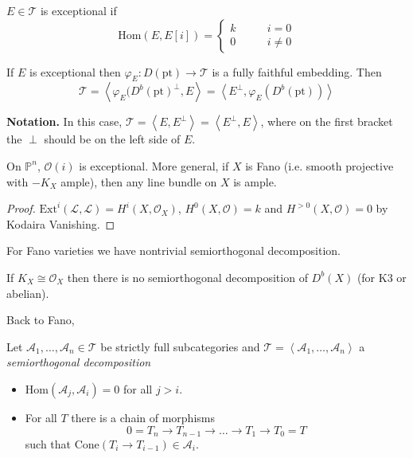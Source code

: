 \medskip\noindent
\begin{definition}
\label{definition-exceptional-object}
$E \in \mathcal{T}$ is exceptional if
$$
\text{Hom}(E,E[i])=
\begin{cases}
k\qquad &i=0 \\
0\qquad &i \neq 0
\end{cases}
$$
\end{definition}

\begin{lemma}
\label{dcos-label-024}
If $E$ is exceptional then
$\varphi_E:D(\text{pt}) \to \mathcal{T}$ is a
fully faithful embedding. Then
$$
\mathcal{T}=\left\langle{}\varphi_E(D^b(\text{pt})
^\perp,E\right\rangle{}=
\left\langle{}E^\perp,\varphi_E(D^b(\text{pt}))
\right\rangle{}
$$
\end{lemma}

{\bf Notation.} In this case,
$\mathcal{T}=\left\langle{}E,E^\perp\right\rangle{}=
\left\langle{}E^\perp,E\right\rangle{}$,
where on the first bracket the $\perp$ should
be on the left side of $E$.

\begin{example}
\label{dcos-label-025}
On  $\mathbb{P}^n$, $\mathcal{O}(i)$ is
exceptional. More general, if $X$ is Fano
(i.e. smooth projective with $-K_X$ ample),
then any line bundle on  $X$ is ample.
\end{example}

\begin{proof}
$\text{Ext}^i(\mathcal{L},\mathcal{L})=H^{i}
(X,\mathcal{O}_X)$,
$H^{0}(X,\mathcal{O})=k$ and
$H^{>0}(X,\mathcal{O})=0$ by Kodaira
Vanishing.
\end{proof}

For Fano varieties we have nontrivial
semiorthogonal decomposition.

\begin{remark}
\label{dcos-label-026}
If $K_X \cong \mathcal{O}_X$ then there is no
semiorthogonal decomposition of $D^b(X)$ (for
K3 or abelian).
\end{remark}

Back to Fano,
\begin{definition}
\label{dcos-label-027}
Let $\mathcal{A}_1,\ldots,\mathcal{A}_n \in
\mathcal{T}$ be strictly full subcategories
and
$\mathcal{T}=\left\langle{}\mathcal{A}_1,\ldots,
\mathcal{A}_n\right\rangle{}$
a {\it semiorthogonal decomposition}
\begin{itemize}
\item
$\text{Hom}(\mathcal{A}_j,\mathcal{A}_i)=0$
for all $j>i$.
\item For all $T$ there is a chain of
morphisms
$$
0 = T_n \to T_{n-1}\to \ldots \to T_1 \to
T_0=T
$$
such that $\text{Cone}(T_i \to T_{i-1}) \in
\mathcal{A}_i$.
\end{itemize}
\end{definition}

